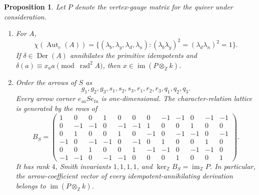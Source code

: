\documentclass[11pt]{amsart}
\theoremstyle{plain}
\newtheorem{proposition}[theorem]{Proposition}
\theoremstyle{definition}
\DeclareMathOperator{\rad}{rad}
\DeclareMathOperator{\Der}{Der}
\DeclareMathOperator{\Aut}{Aut}
\newcommand{\ZZ}{\mathbb{Z}}
\begin{document}
\begin{proposition}\label{prop:linear-data}
Let $P$ denote the vertex-gauge matrix for the quiver under consideration.
\begin{enumerate}
\item For $A$,
\[
 \chi(\Aut_e(A))=
 \{(\lambda_b,\lambda_y,\lambda_d,\lambda_n):(\lambda_b\lambda_y)^2=
 (\lambda_d\lambda_n)^2=1\}.
\]
If $\delta\in\Der(A)$ annihilates the primitive idempotents and $\delta(a)\equiv x_aa\pmod{\rad^2A}$, then
$x\in\operatorname{im}(P\otimes_\ZZ k)$.

\item Order the arrows of $S$ as
\[
 g_1,g_2,g_3,s_1,s_2,s_3,r_1,r_2,r_3,q_1,q_2,q_3.
\]
Every arrow corner $e_{sa}Se_{ta}$ is one-dimensional. The character-relation lattice is generated by the rows
of
\[
B_S=\begin{pmatrix}
 1& 0& 0& 1& 0& 0& 0&-1&-1& 0&-1&-1\\
 0&-1&-1& 0&-1&-1& 1& 0& 0& 1& 0& 0\\
 0& 1& 0& 0& 1& 0&-1& 0&-1&-1& 0&-1\\
-1& 0&-1&-1& 0&-1& 0& 1& 0& 0& 1& 0\\
 0& 0& 1& 0& 0& 1&-1&-1& 0&-1&-1& 0\\
-1&-1& 0&-1&-1& 0& 0& 0& 1& 0& 0& 1
\end{pmatrix}.
\]
It has rank $4$, Smith invariants $1,1,1,1$, and $\ker_\ZZ B_S=\operatorname{im}_\ZZ P$. In particular, the
arrow-coefficient vector of every idempotent-annihilating derivation belongs to
$\operatorname{im}(P\otimes_\ZZ k)$.


\end{enumerate}
\end{proposition}
\end{document}
